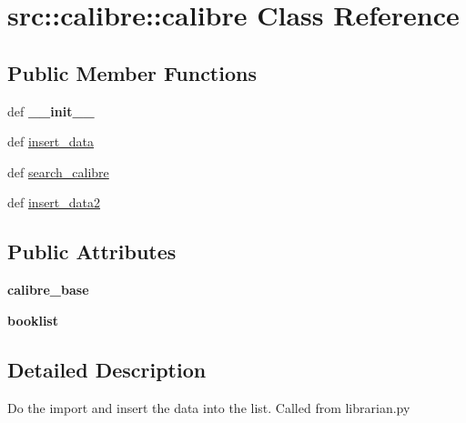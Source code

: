 \hypertarget{classsrc_1_1calibre_1_1calibre}{
\section{src::calibre::calibre Class Reference}
\label{classsrc_1_1calibre_1_1calibre}
}
\subsection*{Public Member Functions}
\begin{DoxyCompactItemize}
\item 
\hypertarget{classsrc_1_1calibre_1_1calibre_afe28ad6d5d54eb40f436872a484da76a}{
def {\bfseries \_\-\_\-init\_\-\_\-}}
\label{classsrc_1_1calibre_1_1calibre_afe28ad6d5d54eb40f436872a484da76a}

\item 
def \hyperlink{classsrc_1_1calibre_1_1calibre_a088c87fe22b26f38b62960c969ba6da5}{insert\_\-data}
\item 
def \hyperlink{classsrc_1_1calibre_1_1calibre_a7c98744e53e5388136effa08221e42df}{search\_\-calibre}
\item 
def \hyperlink{classsrc_1_1calibre_1_1calibre_af2e1b6cd43e4ba15051e0b92fb7a5f29}{insert\_\-data2}
\end{DoxyCompactItemize}
\subsection*{Public Attributes}
\begin{DoxyCompactItemize}
\item 
\hypertarget{classsrc_1_1calibre_1_1calibre_a11881dd7a65070948567165ae45aca6e}{
{\bfseries calibre\_\-base}}
\label{classsrc_1_1calibre_1_1calibre_a11881dd7a65070948567165ae45aca6e}

\item 
\hypertarget{classsrc_1_1calibre_1_1calibre_a8604877f2fa1d0f3b5cdbf1d8b7815b4}{
{\bfseries booklist}}
\label{classsrc_1_1calibre_1_1calibre_a8604877f2fa1d0f3b5cdbf1d8b7815b4}

\end{DoxyCompactItemize}


\subsection{Detailed Description}
\begin{DoxyVerb}Do the import and insert the data into the list.
Called from librarian.py

\end{DoxyVerb}
 

